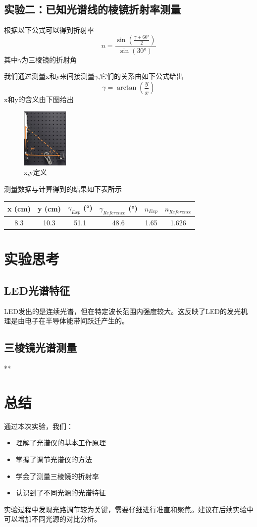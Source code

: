 \documentclass{ctexart}
\begin{document}
\subsection{实验二：已知光谱线的棱镜折射率测量}
根据以下公式可以得到折射率
\begin{equation}
    n = \frac{\sin(\frac{\gamma + 60°}{2})}{\sin(30°)}
\end{equation}
其中$\gamma$为三棱镜的折射角

我们通过测量x和y来间接测量$\gamma$,它们的关系由如下公式给出
\begin{equation}
    \gamma = \arctan(\frac{y}{x})
\end{equation}
x和y的含义由下图给出
\begin{figure}[H]
    \centering
    \includegraphics[width=0.2\textwidth,height=0.3\textwidth]{pictures/xy示意图.png}
    \caption{x,y定义}
\end{figure}
测量数据与计算得到的结果如下表所示
\begin{table}[h]
    \centering
    \begin{tabular}{|c|c|c|c|c|c|}
        \hline
        \rowcolor{yellow!25} x (cm) & y (cm) & $\gamma_{Exp}$ (°) & $\gamma_{Reference}$ (°) & $n_{Exp}$  & $n_{Reference}$  \\
        \hline
        8.3 & 10.3 & 51.1 & 48.6 & 1.65 & 1.626 \\
        \hline
    \end{tabular}
\end{table}
\section{实验思考}

\subsection{LED光谱特征}
LED发出的是连续光谱，但在特定波长范围内强度较大。这反映了LED的发光机理是由电子在半导体能带间跃迁产生的。

\subsection{三棱镜光谱测量}
**

\section{总结}

通过本次实验，我们：
\begin{itemize}
    \item 理解了光谱仪的基本工作原理
    \item 掌握了调节光谱仪的方法
    \item 学会了测量三棱镜的折射率
    \item 认识到了不同光源的光谱特征
\end{itemize}

实验过程中发现光路调节较为关键，需要仔细进行准直和聚焦。建议在后续实验中可以增加不同光源的对比分析。
\end{document}
